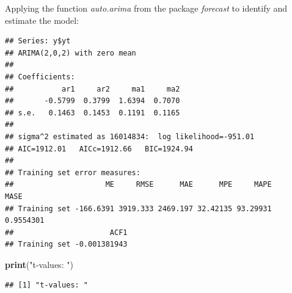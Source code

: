 \documentclass[
]{article}
\newenvironment{Shaded}{\begin{snugshade}}{\end{snugshade}}
\newcommand{\ControlFlowTok}[1]{\textcolor[rgb]{0.13,0.29,0.53}{\textbf{#1}}}
\newcommand{\DataTypeTok}[1]{\textcolor[rgb]{0.13,0.29,0.53}{#1}}
\newcommand{\DecValTok}[1]{\textcolor[rgb]{0.00,0.00,0.81}{#1}}
\newcommand{\KeywordTok}[1]{\textcolor[rgb]{0.13,0.29,0.53}{\textbf{#1}}}
\newcommand{\NormalTok}[1]{#1}
\newcommand{\OperatorTok}[1]{\textcolor[rgb]{0.81,0.36,0.00}{\textbf{#1}}}
\newcommand{\OtherTok}[1]{\textcolor[rgb]{0.56,0.35,0.01}{#1}}
\newcommand{\StringTok}[1]{\textcolor[rgb]{0.31,0.60,0.02}{#1}}
\begin{document}
Applying the function \emph{auto.arima} from the package \emph{forecast}
to identify and estimate the model:

\begin{Shaded}
\end{Shaded}

\begin{verbatim}
## Series: y$yt 
## ARIMA(2,0,2) with zero mean 
## 
## Coefficients:
##           ar1     ar2     ma1     ma2
##       -0.5799  0.3799  1.6394  0.7070
## s.e.   0.1463  0.1453  0.1191  0.1165
## 
## sigma^2 estimated as 16014834:  log likelihood=-951.01
## AIC=1912.01   AICc=1912.66   BIC=1924.94
## 
## Training set error measures:
##                     ME     RMSE      MAE      MPE     MAPE      MASE
## Training set -166.6391 3919.333 2469.197 32.42135 93.29931 0.9554301
##                      ACF1
## Training set -0.001381943
\end{verbatim}

\begin{Shaded}
\begin{Highlighting}[]
\KeywordTok{print}\NormalTok{(}\StringTok{"t-values: "}\NormalTok{)}
\end{Highlighting}
\end{Shaded}

\begin{verbatim}
## [1] "t-values: "
\end{verbatim}

\begin{Shaded}
\end{Shaded}
\end{document}

